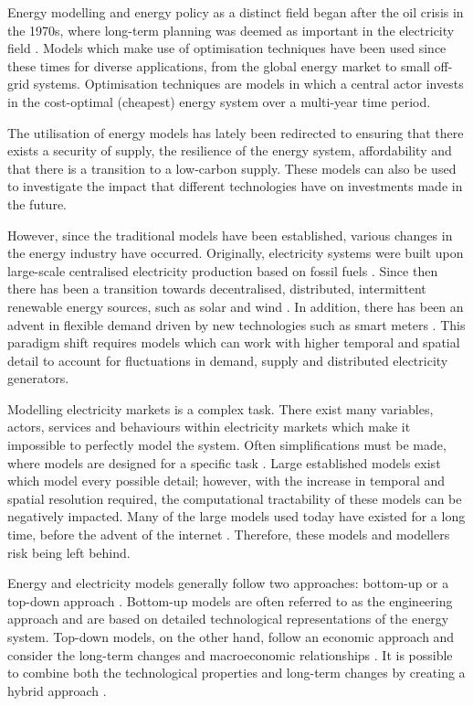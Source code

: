 Energy modelling and energy policy as a distinct field began after the oil crisis in the 1970s, where long-term planning was deemed as important in the electricity field \cite{Craig2002a}. Models which make use of optimisation techniques have been used since these times for diverse applications, from the global energy market to small off-grid systems. Optimisation techniques are models in which a central actor invests in the cost-optimal (cheapest) energy system over a multi-year time period.

The utilisation of energy models has lately been redirected to ensuring that there exists a security of supply, the resilience of the energy system, affordability and that there is a transition to a low-carbon supply. These models can also be used to investigate the impact that different technologies have on investments made in the future. 

However, since the traditional models have been established, various changes in the energy industry have occurred. Originally, electricity systems were built upon large-scale centralised electricity production based on fossil fuels \cite{foxon2010developing}. Since then there has been a transition towards decentralised, distributed, intermittent renewable energy sources, such as solar and wind \cite{IEA2015a}. In addition, there has been an advent in flexible demand driven by new technologies such as smart meters \cite{avancini2019energy}. This paradigm shift requires models which can work with higher temporal and spatial detail to account for fluctuations in demand, supply and distributed electricity generators.

Modelling electricity markets is a complex task. There exist many variables, actors, services and behaviours within electricity markets which make it impossible to perfectly model the system. Often simplifications must be made, where models are designed for a specific task \cite{Pfenninger2014b}. Large established models exist which model every possible detail; however, with the increase in temporal and spatial resolution required, the computational tractability of these models can be negatively impacted. Many of the large models used today have existed for a long time, before the advent of the internet \cite{Pfenninger2014b}. Therefore, these models and modellers risk being left behind.

Energy and electricity models generally follow two approaches: bottom-up or a top-down approach \cite{Ringkjob2018}. Bottom-up models are often referred to as the engineering approach and are based on detailed technological representations of the energy system. Top-down models, on the other hand, follow an economic approach and consider the long-term changes and macroeconomic relationships \cite{Mai2013}. It is possible to combine both the technological properties and long-term changes by creating a hybrid approach \cite{Fortes2014}.




